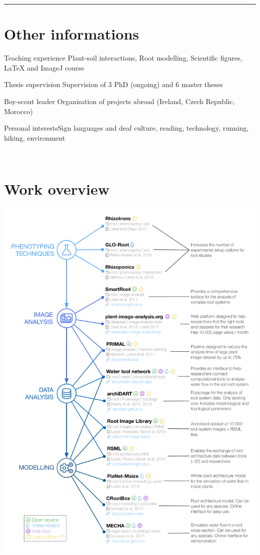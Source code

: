 \documentclass[]{friggeri-cv} %
\begin{document}

\rule{\linewidth}{0.5pt}

\section{Other informations}

\descr 
{Teaching experience}
{}
{Plant-soil interactions, Root modelling, Scientific figures, LaTeX and ImageJ course}

\descr 
{Thesis supervision}
{}
{Supervision of 3 PhD (ongoing) and 6 master theses}


\descr
{Boy-scout leader}{}
{Organisation of projects abroad (Ireland, Czech Republic, Morocco)}

\descr
{Personal interests}{}{Sign languages and deaf culture, reading, technology, running, hiking, environment}



\newpage
~
\vspace{0.05cm}
\section{Work overview}
\hspace*{-0.3\linewidth}
\includegraphics[width=1.3\linewidth]{workoverview.pdf}
\end{document}
